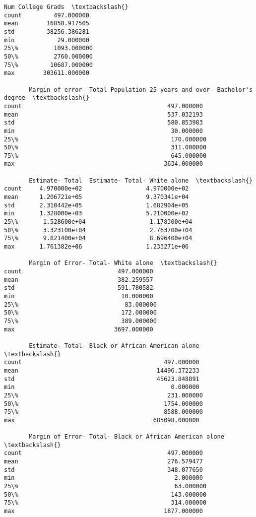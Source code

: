 \documentclass[11pt]{article}
\begin{document}
\begin{tcolorbox}[breakable, size=fbox, boxrule=.5pt, pad at break*=1mm, opacityfill=0]
\begin{Verbatim}[commandchars=\\\{\}]
       Num College Grads  \textbackslash{}
count         497.000000
mean        16850.917505
std         38256.386281
min            29.000000
25\%          1093.000000
50\%          2760.000000
75\%         10687.000000
max        303611.000000

       Margin of error- Total Population 25 years and over- Bachelor's degree  \textbackslash{}
count                                         497.000000
mean                                          537.032193
std                                           580.853983
min                                            30.000000
25\%                                           170.000000
50\%                                           311.000000
75\%                                           645.000000
max                                          3634.000000

       Estimate- Total  Estimate- Total- White alone  \textbackslash{}
count     4.970000e+02                  4.970000e+02
mean      1.206721e+05                  9.370341e+04
std       2.310442e+05                  1.682904e+05
min       1.328000e+03                  5.210000e+02
25\%       1.528600e+04                  1.178300e+04
50\%       3.323100e+04                  2.763700e+04
75\%       9.821400e+04                  8.696400e+04
max       1.761382e+06                  1.233271e+06

       Margin of Error- Total- White alone  \textbackslash{}
count                           497.000000
mean                            382.259557
std                             591.780582
min                              10.000000
25\%                              83.000000
50\%                             172.000000
75\%                             389.000000
max                            3697.000000

       Estimate- Total- Black or African American alone  \textbackslash{}
count                                        497.000000
mean                                       14496.372233
std                                        45623.848891
min                                            0.000000
25\%                                          231.000000
50\%                                         1754.000000
75\%                                         8588.000000
max                                       685098.000000

       Margin of Error- Total- Black or African American alone  \textbackslash{}
count                                         497.000000
mean                                          276.579477
std                                           348.077650
min                                             2.000000
25\%                                            63.000000
50\%                                           143.000000
75\%                                           314.000000
max                                          1877.000000


\end{Verbatim}
\end{tcolorbox}
\end{document}
